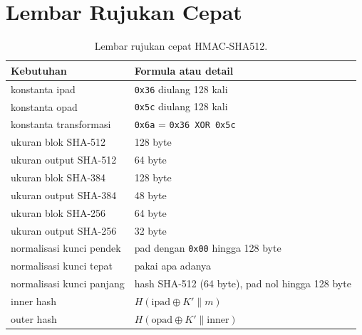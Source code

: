 \documentclass[11pt,a4paper]{article}
\begin{document}
\section{Lembar Rujukan Cepat}

\begin{table}[H]
	\centering
	\caption{Lembar rujukan cepat HMAC-SHA512.}
	\label{tab:cheat}
	\footnotesize
	\begin{tabularx}{\textwidth}{l X}
		\toprule
		Kebutuhan                 & Formula atau detail                                                        \\
		\midrule
		konstanta ipad            & \texttt{0x36} diulang 128 kali                                             \\
		konstanta opad            & \texttt{0x5c} diulang 128 kali                                             \\
		konstanta transformasi    & \texttt{0x6a} = \texttt{0x36 XOR 0x5c}                                     \\
		ukuran blok SHA-512       & 128 byte                                                                   \\
		ukuran output SHA-512     & 64 byte                                                                    \\
		ukuran blok SHA-384       & 128 byte                                                                   \\
		ukuran output SHA-384     & 48 byte                                                                    \\
		ukuran blok SHA-256       & 64 byte                                                                    \\
		ukuran output SHA-256     & 32 byte                                                                    \\
		normalisasi kunci pendek  & pad dengan \texttt{0x00} hingga 128 byte                                   \\
		normalisasi kunci tepat   & pakai apa adanya                                                           \\
		normalisasi kunci panjang & hash SHA-512 (64 byte), pad nol hingga 128 byte                            \\
		inner hash                & $H(\text{ipad} \oplus K' \parallel m)$                                     \\
		outer hash                & $H(\text{opad} \oplus K' \parallel \text{inner})$                          \\

\end{tabularx}
\end{table}
\end{document}
